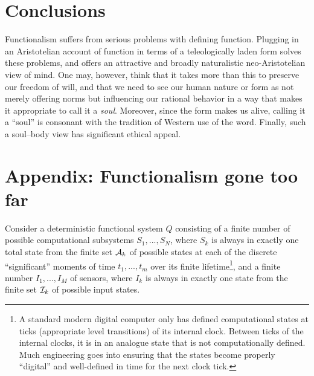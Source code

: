 \section{Conclusions}
Functionalism suffers from serious problems with defining function. Plugging in an Aristotelian account
of function in terms of a teleologically laden form solves these problems, and offers an attractive and
broadly naturalistic neo-Aristotelian view of mind. One may, however, think that it takes more than this
to preserve our freedom of will, and that we need to see our human nature or form as not merely offering norms but influencing
our rational behavior in a way that makes it appropriate to call it a \textit{soul}. Moreover, since the form
makes us alive, calling it a ``soul'' is consonant with the tradition of Western use of the word. 
Finally, such a soul--body
view has significant ethical appeal.

\section*{Appendix: Functionalism gone too far}
Consider a deterministic functional system $Q$ consisting of a 
finite number of possible computational subsystems $S_1,...,S_N$, where $S_k$ is always in exactly one total state from the finite set $\mathcal A_k$
of possible states at each of the discrete ``significant'' moments of time $t_1,...,t_m$ over its finite lifetime\footnote{A standard modern digital computer only has defined 
computational states at ticks (appropriate level transitions) of its internal clock. Between ticks of the internal clocks, it is in an analogue state that is not
computationally defined. Much engineering goes into ensuring that the states become properly ``digital'' and
well-defined in time for the next clock tick.}, and 
a finite number $I_1,...,I_M$ of sensors, where $I_k$ is always in exactly one state from the finite set $\mathcal I_k$ of possible input
states.

